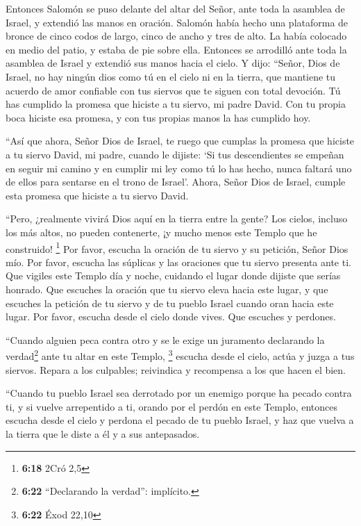 Entonces Salomón se puso delante del altar del Señor,
ante toda la asamblea de Israel, y extendió las manos en oración.
 Salomón había hecho una plataforma de bronce de cinco
codos de largo, cinco de ancho y tres de alto. La había colocado en
medio del patio, y estaba de pie sobre ella. Entonces se arrodilló ante
toda la asamblea de Israel y extendió sus manos hacia el cielo.
 Y dijo: ``Señor, Dios de Israel, no hay ningún dios como
tú en el cielo ni en la tierra, que mantiene tu acuerdo de amor
confiable con tus siervos que te siguen con total devoción.
 Tú has cumplido la promesa que hiciste a tu siervo, mi
padre David. Con tu propia boca hiciste esa promesa, y con tus propias
manos la has cumplido hoy.

 ``Así que ahora, Señor Dios de Israel, te ruego que
cumplas la promesa que hiciste a tu siervo David, mi padre, cuando le
dijiste: `Si tus descendientes se empeñan en seguir mi camino y en
cumplir mi ley como tú lo has hecho, nunca faltará uno de ellos para
sentarse en el trono de Israel'.  Ahora, Señor Dios de
Israel, cumple esta promesa que hiciste a tu siervo David.

 ``Pero, ¿realmente vivirá Dios aquí en la tierra entre
la gente? Los cielos, incluso los más altos, no pueden contenerte, ¡y
mucho menos este Templo que he construido! \footnote{\textbf{6:18} 2Cró
  2,5}  Por favor, escucha la oración de tu siervo y su
petición, Señor Dios mío. Por favor, escucha las súplicas y las
oraciones que tu siervo presenta ante ti.  Que vigiles
este Templo día y noche, cuidando el lugar donde dijiste que serías
honrado. Que escuches la oración que tu siervo eleva hacia este lugar,
 y que escuches la petición de tu siervo y de tu pueblo
Israel cuando oran hacia este lugar. Por favor, escucha desde el cielo
donde vives. Que escuches y perdones.

 ``Cuando alguien peca contra otro y se le exige un
juramento declarando la verdad\footnote{\textbf{6:22} ``Declarando la
  verdad'': implícito.} ante tu altar en este Templo, \footnote{\textbf{6:22}
  Éxod 22,10}  escucha desde el cielo, actúa y juzga a
tus siervos. Repara a los culpables; reivindica y recompensa a los que
hacen el bien.

 ``Cuando tu pueblo Israel sea derrotado por un enemigo
porque ha pecado contra ti, y si vuelve arrepentido a ti, orando por el
perdón en este Templo,  entonces escucha desde el cielo y
perdona el pecado de tu pueblo Israel, y haz que vuelva a la tierra que
le diste a él y a sus antepasados.

